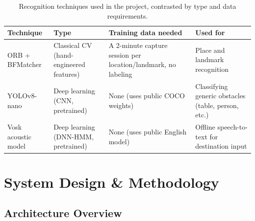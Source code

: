 \documentclass[12pt,a4paper]{article}
\begin{document}
\begin{table}[H]
\centering
\begin{tabularx}{\textwidth}{l X X X}
\toprule
\textbf{Technique} & \textbf{Type} & \textbf{Training data needed} & \textbf{Used for} \\
\midrule
ORB + BFMatcher & Classical CV (hand-engineered features) & A 2-minute capture session per location/landmark, no labeling & Place and landmark recognition \\
YOLOv8-nano & Deep learning (CNN, pretrained) & None (uses public COCO weights) & Classifying generic obstacles (table, person, etc.) \\
Vosk acoustic model & Deep learning (DNN-HMM, pretrained) & None (uses public English model) & Offline speech-to-text for destination input \\
\bottomrule
\end{tabularx}
\caption{Recognition techniques used in the project, contrasted by type and data requirements.}
\label{tab:cv-vs-dl}
\end{table}

\section{System Design \& Methodology}
\label{sec:design}

\subsection{Architecture Overview}
\end{document}
